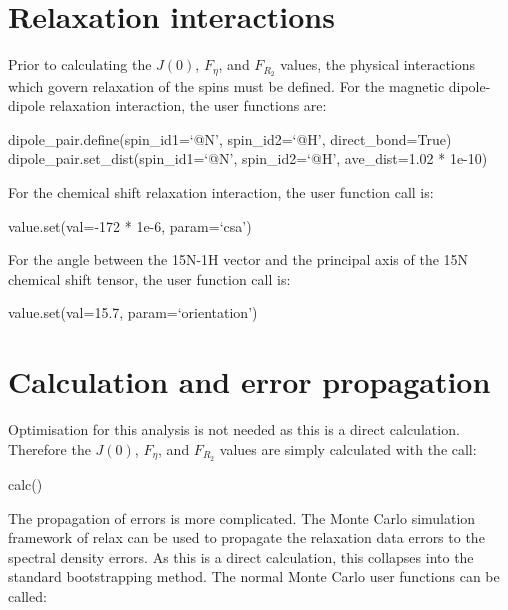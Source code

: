 
\section{Relaxation interactions}

Prior to calculating the $J(0)$, $F_\eta$, and $F_{R_2}$ values, the physical interactions which govern relaxation of the spins must be defined.  For the magnetic dipole-dipole relaxation interaction, the user functions are:

\begin{exampleenv}
dipole\_pair.define(spin\_id1=`@N', spin\_id2=`@H', direct\_bond=True) \\
dipole\_pair.set\_dist(spin\_id1=`@N', spin\_id2=`@H', ave\_dist=1.02 * 1e-10)
\end{exampleenv}

For the chemical shift relaxation interaction, the user function call is:

\begin{exampleenv}
value.set(val=-172 * 1e-6, param=`csa')
\end{exampleenv}

For the angle between the 15N-1H vector and the principal axis of the 15N chemical shift tensor, the user function call is:

\begin{exampleenv}
value.set(val=15.7, param=`orientation')
\end{exampleenv}



\section{Calculation and error propagation}

Optimisation for this analysis is not needed as this is a direct calculation.  Therefore the $J(0)$, $F_\eta$, and $F_{R_2}$ values are simply calculated with the call:

\begin{exampleenv}
calc()
\end{exampleenv}

The propagation of errors is more complicated.  The Monte Carlo simulation framework of relax can be used to propagate the relaxation data errors to the spectral density errors.  As this is a direct calculation, this collapses into the standard bootstrapping method.  The normal Monte Carlo user functions can be called:

